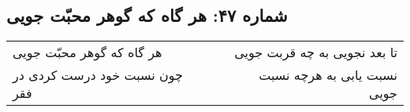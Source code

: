 \begin{center}
\section*{شماره ۴۷: هر گاه که گوهر محبّت جویی}
\label{sec:047}
\begin{longtable}{l p{0.5cm} r}
هر گاه که گوهر محبّت جویی
&&
تا بعد نجویی به چه قربت جویی
\\
چون نسبت خود درست کردی در فقر
&&
نسبت یابی به هرچه نسبت جویی
\\
\end{longtable}
\end{center}
